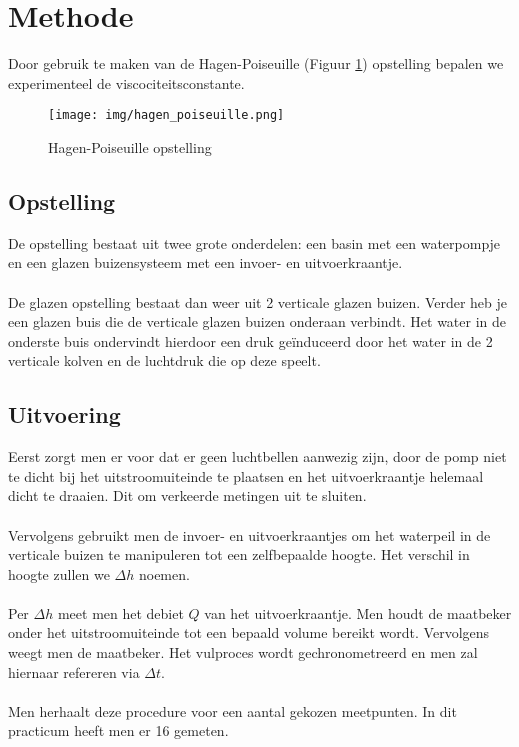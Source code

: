 \section{Methode}

Door gebruik te maken van de Hagen-Poiseuille (Figuur \ref{fig:hagen-pois}) 
opstelling bepalen we experimenteel de viscociteitsconstante. \\

\begin{figure}[h]
    \centering
    \caption{Hagen-Poiseuille opstelling}
    \texttt{[image: img/hagen\_poiseuille.png]}
    \label{fig:hagen-pois}
\end{figure}

\subsection{Opstelling}

De opstelling bestaat uit twee grote onderdelen: een basin
met een waterpompje en een glazen buizensysteem met
een invoer- en uitvoerkraantje.
\\ \\
De glazen opstelling bestaat dan weer uit 2 verticale 
glazen buizen. Verder heb je een glazen buis
die de verticale glazen buizen onderaan verbindt.
Het water in de onderste buis ondervindt hierdoor een druk
geïnduceerd door het water in de 2 verticale kolven en de
luchtdruk die op deze speelt.

\subsection{Uitvoering}

Eerst zorgt men er voor dat er geen luchtbellen aanwezig zijn, door
de pomp niet te dicht bij het uitstroomuiteinde te plaatsen
en het uitvoerkraantje helemaal dicht te draaien.
Dit om verkeerde metingen uit te sluiten.
\\ \\
Vervolgens gebruikt men de invoer- en uitvoerkraantjes om
het waterpeil in de verticale buizen te manipuleren tot
een zelfbepaalde hoogte. Het verschil in hoogte zullen we
$\Delta h$ noemen.
\\ \\
Per $\Delta h$ meet men het debiet $Q$ van het
uitvoerkraantje. Men houdt de maatbeker onder het uitstroomuiteinde 
tot een bepaald volume bereikt wordt.
Vervolgens weegt men de maatbeker. Het vulproces wordt gechronometreerd
en men zal hiernaar refereren via $\Delta t$.
\\ \\
Men herhaalt deze procedure voor een aantal gekozen meetpunten.
In dit practicum heeft men er 16 gemeten.


